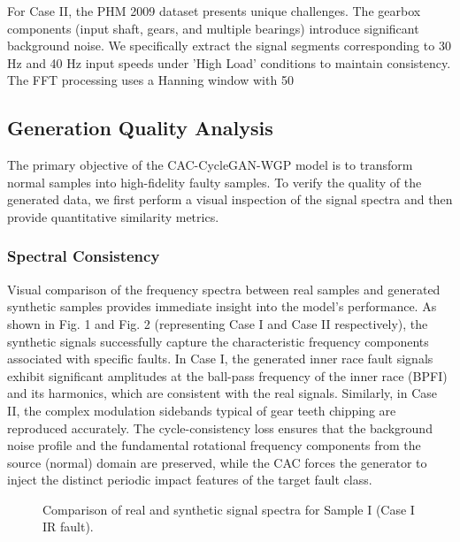 For Case II, the PHM 2009 dataset presents unique challenges. The gearbox components (input shaft, gears, and multiple bearings) introduce significant background noise. We specifically extract the signal segments corresponding to 30 Hz and 40 Hz input speeds under 'High Load' conditions to maintain consistency. The FFT processing uses a Hanning window with 50%

\subsection{Generation Quality Analysis}
The primary objective of the CAC-CycleGAN-WGP model is to transform normal samples into high-fidelity faulty samples. To verify the quality of the generated data, we first perform a visual inspection of the signal spectra and then provide quantitative similarity metrics.

\subsubsection{Spectral Consistency}
Visual comparison of the frequency spectra between real samples and generated synthetic samples provides immediate insight into the model's performance. As shown in Fig. 1 and Fig. 2 (representing Case I and Case II respectively), the synthetic signals successfully capture the characteristic frequency components associated with specific faults. In Case I, the generated inner race fault signals exhibit significant amplitudes at the ball-pass frequency of the inner race (BPFI) and its harmonics, which are consistent with the real signals. Similarly, in Case II, the complex modulation sidebands typical of gear teeth chipping are reproduced accurately. The cycle-consistency loss ensures that the background noise profile and the fundamental rotational frequency components from the source (normal) domain are preserved, while the CAC forces the generator to inject the distinct periodic impact features of the target fault class.

\begin{figure}[htbp]
\centering
\caption{Comparison of real and synthetic signal spectra for Sample I (Case I IR fault).}
\label{fig:gen_quality_1}
\end{figure}

